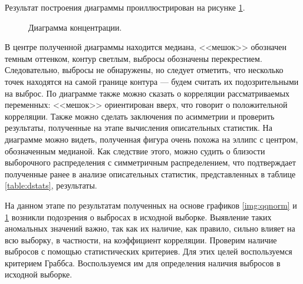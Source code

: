 Результат построения диаграммы проиллюстрирован на рисунке \ref{img:bagplot}.
\begin{figure}[ht]
\caption{Диаграмма концентрации.}
\label{img:bagplot}
\end{figure}
В центре полученной диаграммы находится медиана, <<мешок>> обозначен темным оттенком, контур светлым, выбросы обозначены перекрестием. Следовательно, выбросы не обнаружены, но следует отметить, что несколько точек находятся на самой границе контура --- будем считать их подозрительными на выброс. По диаграмме также можно сказать о корреляции рассматриваемых переменных: <<мешок>> ориентирован вверх, что говорит о положительной корреляции. Также можно сделать заключения по асимметрии и проверить результаты, полученные на этапе вычисления описательных статистик. На диаграмме можно видеть, полученная фигура очень похожа на эллипс с центром, обозначенным медианой. Как следствие этого, можно судить о близости выборочного распределения с симметричным распределением, что подтверждает полученные ранее в анализе описательных статистик, представленных в таблице \ref{table:dstats}, результаты.

На данном этапе по результатам полученных на основе графиков \ref{img:qqnorm} и \ref{img:bagplot} возникли подозрения о выбросах в исходной выборке. Выявление таких аномальных значений важно, так как их наличие, как правило, сильно влияет на всю выборку, в частности, на коэффициент корреляции. Проверим наличие выбросов с помощью статистических критериев. Для этих целей воспользуемся критерием Граббса. Воспользуемся им для определения наличия выбросов в исходной выборке. 

